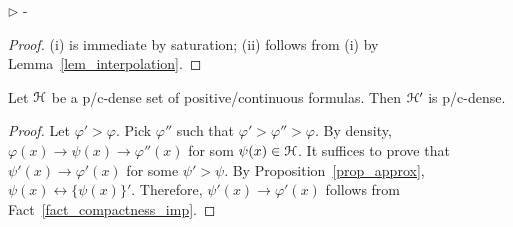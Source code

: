 \documentclass{amsproc}
\newcommand{\mylabel}[1]{{#1}\hfill}
\renewenvironment{itemize}
  {\begin{list}{$\triangleright$}{%
  \setlength{\parskip}{0mm}
  \setlength{\topsep}{.4\baselineskip}
  \setlength{\rightmargin}{0mm}
  \setlength{\listparindent}{0mm}
  \setlength{\itemindent}{0mm}
  \setlength{\labelwidth}{3ex}
  \setlength{\itemsep}{.2\baselineskip}
  \setlength{\parsep}{.2\baselineskip}
  \setlength{\partopsep}{0mm}
  \setlength{\labelsep}{1ex}
  \setlength{\leftmargin}{\labelwidth+\labelsep}
  \let\makelabel\mylabel}}{%
\end{list}}
\begin{document}
{\begin{fact}
\begin{itemize}
    \noindent\kern-\leftmargin
  \end{itemize} 
\end{fact}

\begin{proof}
  (i) is immediate by saturation; (ii) follows from (i) by Lemma~\ref{lem_interpolation}.
\end{proof}

\begin{fact}\label{fact_Fdense}
  Let ${\EuScript H}$ be a p/c-dense set of positive/continuous formulas.
  Then ${\EuScript H}'$ is p/c-dense.
\end{fact}

\begin{proof}
  Let $\varphi'>\varphi$.
  Pick $\varphi''$ such that $\varphi'>\varphi''>\varphi$.
  By density, $\varphi(x)\rightarrow\psi(x)\rightarrow\varphi''(x)$ for som $\psi(x)\in{\EuScript H}$.
  It suffices to prove that $\psi'(x)\rightarrow\varphi'(x)$ for some $\psi'>\psi$.
  By Proposition~\ref{prop_approx}, $\psi(x)\leftrightarrow\{\psi(x)\}'$.
  Therefore, $\psi'(x)\rightarrow\varphi'(x)$ follows from Fact~\ref{fact_compactness_imp}.
\end{proof}

  











}
\end{document}
